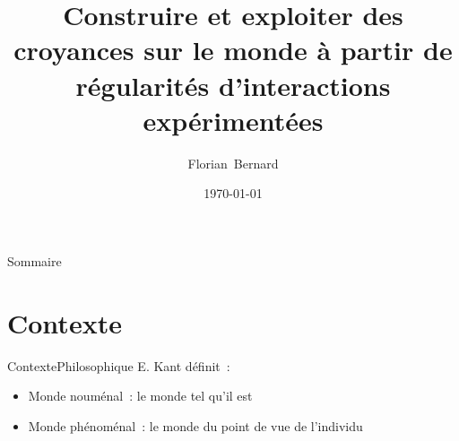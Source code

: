 \documentclass{beamer}
\title{
Construire et exploiter des croyances sur le monde à partir de régularités d'interactions expérimentées\\}
\author{Florian~Bernard}
\institute[Université Claude Bernard] %
{
  
 Encadrant : Amélie Cordier \\
 Avec la participation d'Olivier Georgeon
}
\date{\today}
\begin{document}
\begin{frame}
  \titlepage
\end{frame}

\begin{frame}{Sommaire}
  \tableofcontents
\end{frame}

\section{Contexte}
\begin{frame}{Contexte}{Philosophique}
	E. Kant définit~:
	\begin{itemize}
		\item Monde nouménal~: le monde tel qu'il est
		\item Monde phénoménal~: le monde du point de vue de l'individu
	\end{itemize}
%		
\end{frame}
\end{document}
